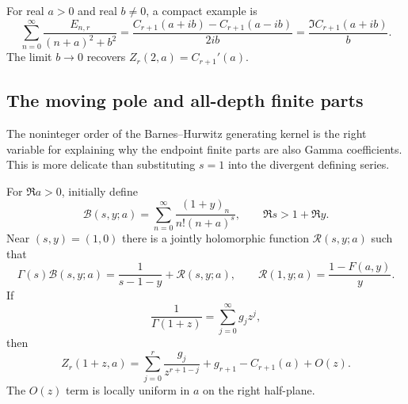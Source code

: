 For real $a>0$ and real $b\ne0$, a compact example is
\begin{equation}\label{harm:eq:quadratic-kernel}
 \boxed{\displaystyle
 \sum_{n=0}^{\infty}\frac{E_{n,r}}{(n+a)^2+b^2}
 =\frac{C_{r+1}(a+ib)-C_{r+1}(a-ib)}{2ib}
 =\frac{\Im C_{r+1}(a+ib)}b.}
\end{equation}
The limit $b\to0$ recovers $Z_r(2,a)=C_{r+1}'(a)$.

\subsection{The moving pole and all-depth finite parts}

The noninteger order of the Barnes--Hurwitz generating kernel is the
right variable for explaining why the endpoint finite parts are also
Gamma coefficients.  This is more delicate than substituting $s=1$ into
the divergent defining series.

\begin{theorem}\label{harm:thm:moving-pole}
For $\Re a>0$, initially define
\begin{equation}\label{harm:eq:Barnes-kernel}
 \mathcal B(s,y;a)=\sum_{n=0}^{\infty}
            \frac{(1+y)_n}{n!(n+a)^s},
 \qquad \Re s>1+\Re y.
\end{equation}
Near $(s,y)=(1,0)$ there is a jointly holomorphic function
$\mathcal R(s,y;a)$ such that
\begin{equation}\label{harm:eq:moving-pole}
 \Gamma(s)\mathcal B(s,y;a)
 =\frac1{s-1-y}+\mathcal R(s,y;a),
 \qquad
 \mathcal R(1,y;a)=\frac{1-F(a,y)}y.
\end{equation}
If
\begin{equation}\label{harm:eq:reciprocal-gamma}
 \frac1{\Gamma(1+z)}=\sum_{j=0}^{\infty}g_jz^j,
\end{equation}
then
\begin{equation}\label{harm:eq:all-depth-finite-part}
 \boxed{\displaystyle
 Z_r(1+z,a)=\sum_{j=0}^{r}\frac{g_j}{z^{r+1-j}}
          +g_{r+1}-C_{r+1}(a)+O(z).}
\end{equation}
The $O(z)$ term is locally uniform in $a$ on the right half-plane.
\end{theorem}

